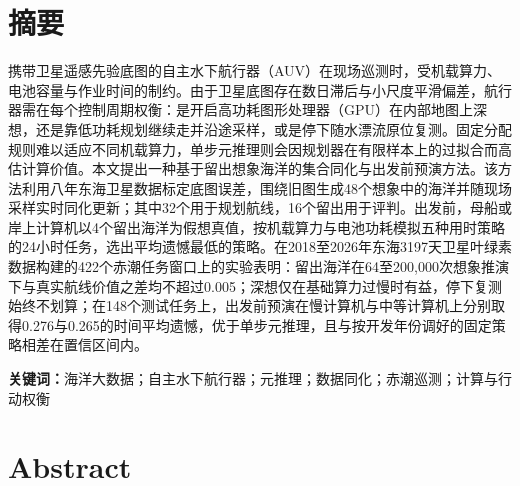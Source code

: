\section*{摘\quad 要}

携带卫星遥感先验底图的自主水下航行器（AUV）在现场巡测时，受机载算力、电池容量与作业时间的制约。由于卫星底图存在数日滞后与小尺度平滑偏差，航行器需在每个控制周期权衡：是开启高功耗图形处理器（GPU）在内部地图上深想，还是靠低功耗规划继续走并沿途采样，或是停下随水漂流原位复测。固定分配规则难以适应不同机载算力，单步元推理则会因规划器在有限样本上的过拟合而高估计算价值。本文提出一种基于留出想象海洋的集合同化与出发前预演方法。该方法利用八年东海卫星数据标定底图误差，围绕旧图生成48个想象中的海洋并随现场采样实时同化更新；其中32个用于规划航线，16个留出用于评判。出发前，母船或岸上计算机以4个留出海洋为假想真值，按机载算力与电池功耗模拟五种用时策略的24小时任务，选出平均遗憾最低的策略。在2018至2026年东海3197天卫星叶绿素数据构建的422个赤潮任务窗口上的实验表明：留出海洋在64至200,000次想象推演下与真实航线价值之差均不超过0.005；深想仅在基础算力过慢时有益，停下复测始终不划算；在148个测试任务上，出发前预演在慢计算机与中等计算机上分别取得0.276与0.265的时间平均遗憾，优于单步元推理，且与按开发年份调好的固定策略相差在置信区间内。

\vspace{1em}
\noindent\textbf{关键词：}海洋大数据；自主水下航行器；元推理；数据同化；赤潮巡测；计算与行动权衡

\clearpage
\section*{Abstract}

